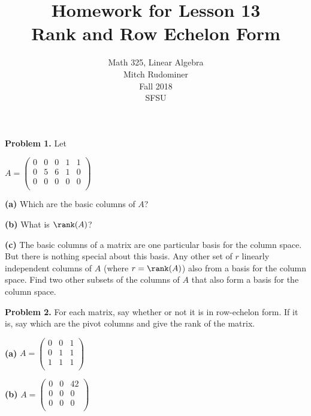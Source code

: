 \documentclass[oneside,12pt]{amsart}
\begin{document}
\title{Homework for Lesson 13 \\ Rank and Row Echelon Form}
\author{Math 325, Linear Algebra \\ Mitch Rudominer \\ Fall 2018 \\ SFSU }
\date{}

\maketitle

\bigskip

\textbf{Problem 1.} Let

$
A =
\begin{pmatrix}
0 & 0 & 0  & 1  & 1\\
0 & 5 & 6  & 1  & 0\\
0 & 0 & 0  & 0  & 0\\
\end{pmatrix}
$

\medskip

\textbf{(a)} Which are the basic columns of $A$?

\bigskip
\bigskip
\bigskip
\bigskip
\bigskip
\bigskip

\textbf{(b)} What is $\rank(A)$?

\bigskip
\bigskip
\bigskip
\bigskip
\bigskip
\bigskip

\textbf{(c)} The basic columns of a matrix are one particular basis for
the column space. But there is nothing special about this basis.  Any other
set of $r$ linearly independent columns of $A$ (where $r=\rank(A)$) also from
a basis for the column space. Find
two other subsets of the columns of $A$ that also form a basis for the column
space.

\bigskip
\bigskip
\bigskip
\bigskip
\bigskip
\bigskip

\newpage

\textbf{Problem 2.} For each matrix, say whether or not it is in row-echelon
form. If it is, say which are the pivot columns and give the rank of the matrix.


\textbf{(a)}
$
A =
\begin{pmatrix}
0 & 0 & 1\\
0 & 1 & 1\\
1 & 1 & 1\\
\end{pmatrix}
$

\bigskip
\bigskip
\bigskip
\bigskip
\bigskip
\bigskip

\textbf{(b)}
$
A =
\begin{pmatrix}
0 & 0 & 42\\
0 & 0 & 0\\
0 & 0 & 0\\
\end{pmatrix}
$
\end{document}
